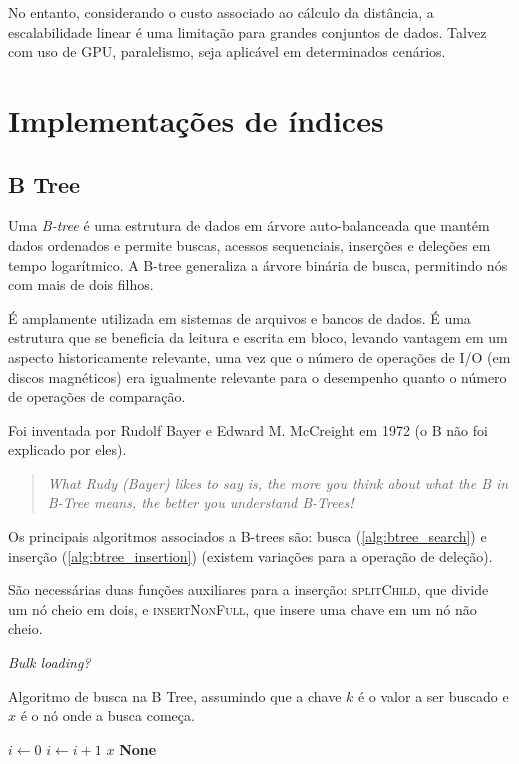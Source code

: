 No entanto, considerando o custo associado ao cálculo da distância, a escalabilidade linear é uma limitação para grandes conjuntos de dados. Talvez com uso de GPU, paralelismo, seja aplicável em determinados cenários.

\section{Implementações de índices}

\subsection{B Tree}

Uma \textit{B-tree} é uma estrutura de dados em árvore auto-balanceada que mantém dados ordenados e permite buscas, acessos sequenciais, inserções e deleções em tempo logarítmico. A B-tree generaliza a árvore binária de busca, permitindo nós com mais de dois filhos.

É amplamente utilizada em sistemas de arquivos e bancos de dados. É uma estrutura que se beneficia da leitura e escrita em bloco, levando vantagem em um aspecto historicamente relevante, uma vez que o número de operações de I/O (em discos magnéticos) era igualmente relevante para o desempenho quanto o número de operações de comparação.

Foi inventada por Rudolf Bayer e Edward M. McCreight em 1972 \cite{btree:bayer1970} (o B não foi explicado por eles).

\begin{quotation}
    \it What Rudy (Bayer) likes to say is, the more you think about what the B in B-Tree means, the better you understand B-Trees!
\end{quotation}

Os principais algoritmos associados a B-trees são: busca (\cref{alg:btree_search}) e inserção (\cref{alg:btree_insertion}) (existem variações para a operação de deleção).

São necessárias duas funções auxiliares para a inserção: \textsc{splitChild}, que divide um nó cheio em dois, e \textsc{insertNonFull}, que insere uma chave em um nó não cheio.

\textit{Bulk loading?}

\begin{algorithm}
\caption{Algoritmo de busca na B Tree, assumindo que a chave $k$ é o valor a ser buscado e $x$ é o nó onde a busca começa.}
\label{alg:btree_search}
\begin{algorithmic}[1]
    \State $i \gets 0$
        \State $i \gets i + 1$
    \EndWhile
        \State \Return $x$
    \EndIf
        \State \Return \textbf{None}
    \EndIf
    \State \Return {}
\EndProcedure
\end{algorithmic}
\end{algorithm}

